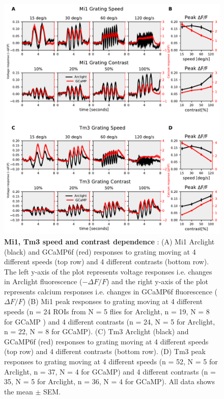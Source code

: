\documentclass[9pt,lineno]{elife}
\begin{document}
\begin{figure}
\begin{fullwidth}
\includegraphics[width=0.84\linewidth]{figure7}
\caption{\textbf{Mi1, Tm3 speed and contrast dependence} : (A) Mi1 Arclight (black) and GCaMP6f (red) responses to grating moving at 4 different speeds (top row) and 4 different contrasts (bottom row). The left y-axis of the plot represents voltage responses i.e. changes in Arclight fluorescence ($-\Delta F/F$) and the right y-axis of the plot represents calcium responses i.e. changes in GCaMP6f fluorescence ($\Delta F/F$) (B) Mi1 peak responses to grating moving at 4 different speeds (n = 24 ROIs from N = 5 flies for Arclight, n = 19, N = 8 for GCaMP ) and 4 different contrasts (n = 24, N = 5 for Arclight, n = 22, N = 8 for GCaMP).  (C) Tm3 Arclight (black) and GCaMP6f (red) responses to grating moving at 4 different speeds (top row) and 4 different contrasts (bottom row). (D) Tm3 peak responses to grating moving at 4 different speeds (n = 52, N = 5 for Arclight, n = 37, N = 4 for GCaMP) and 4 different contrasts (n = 35, N = 5 for Arclight, n = 36, N = 4 for GCaMP). All data shows the mean $\pm$ SEM.}

\label{Mi1Tm3data}
	
\end{fullwidth}
\end{figure} 
\end{document}

